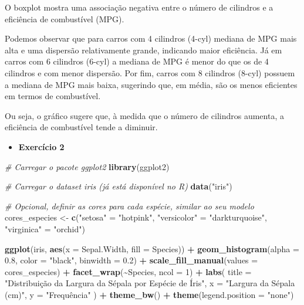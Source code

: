 \documentclass[
]{book}
\newenvironment{Shaded}{\begin{snugshade}}{\end{snugshade}}
\newcommand{\AttributeTok}[1]{\textcolor[rgb]{0.13,0.29,0.53}{#1}}
\newcommand{\CommentTok}[1]{\textcolor[rgb]{0.56,0.35,0.01}{\textit{#1}}}
\newcommand{\DecValTok}[1]{\textcolor[rgb]{0.00,0.00,0.81}{#1}}
\newcommand{\FloatTok}[1]{\textcolor[rgb]{0.00,0.00,0.81}{#1}}
\newcommand{\FunctionTok}[1]{\textcolor[rgb]{0.13,0.29,0.53}{\textbf{#1}}}
\newcommand{\NormalTok}[1]{#1}
\newcommand{\OtherTok}[1]{\textcolor[rgb]{0.56,0.35,0.01}{#1}}
\newcommand{\SpecialCharTok}[1]{\textcolor[rgb]{0.81,0.36,0.00}{\textbf{#1}}}
\newcommand{\StringTok}[1]{\textcolor[rgb]{0.31,0.60,0.02}{#1}}
\providecommand{\tightlist}{%
  \setlength{\itemsep}{0pt}\setlength{\parskip}{0pt}}
\begin{document}
O boxplot mostra uma associação negativa entre o número de cilindros e a eficiência de combustível (MPG).

Podemos observar que para carros com 4 cilindros (4-cyl) mediana de MPG mais alta e uma dispersão relativamente grande, indicando maior eficiência. Já em carros com 6 cilindros (6-cyl) a mediana de MPG é menor do que os de 4 cilindros e com menor dispersão. Por fim, carros com 8 cilindros (8-cyl) possuem a mediana de MPG mais baixa, sugerindo que, em média, são os menos eficientes em termos de combustível.

Ou seja, o gráfico sugere que, à medida que o número de cilindros aumenta, a eficiência de combustível tende a diminuir.

\begin{itemize}
\tightlist
\item
  \textbf{Exercício 2}
\end{itemize}

\begin{Shaded}
\begin{Highlighting}[]
\CommentTok{\# Carregar o pacote ggplot2}
\FunctionTok{library}\NormalTok{(ggplot2)}

\CommentTok{\# Carregar o dataset iris (já está disponível no R)}
\FunctionTok{data}\NormalTok{(}\StringTok{"iris"}\NormalTok{)}

\CommentTok{\# Opcional, definir as cores para cada espécie, similar ao seu modelo}
\NormalTok{cores\_especies }\OtherTok{\textless{}{-}} \FunctionTok{c}\NormalTok{(}\StringTok{"setosa"} \OtherTok{=} \StringTok{"hotpink"}\NormalTok{,}
                    \StringTok{"versicolor"} \OtherTok{=} \StringTok{"darkturquoise"}\NormalTok{,  }
                    \StringTok{"virginica"} \OtherTok{=} \StringTok{"orchid"}\NormalTok{) }


\FunctionTok{ggplot}\NormalTok{(iris, }\FunctionTok{aes}\NormalTok{(}\AttributeTok{x =}\NormalTok{ Sepal.Width, }\AttributeTok{fill =}\NormalTok{ Species)) }\SpecialCharTok{+}
  \FunctionTok{geom\_histogram}\NormalTok{(}\AttributeTok{alpha =} \FloatTok{0.8}\NormalTok{, }\AttributeTok{color =} \StringTok{"black"}\NormalTok{, }\AttributeTok{binwidth =} \FloatTok{0.2}\NormalTok{) }\SpecialCharTok{+} 
  \FunctionTok{scale\_fill\_manual}\NormalTok{(}\AttributeTok{values =}\NormalTok{ cores\_especies) }\SpecialCharTok{+}
  \FunctionTok{facet\_wrap}\NormalTok{(}\SpecialCharTok{\textasciitilde{}}\NormalTok{Species, }\AttributeTok{ncol =} \DecValTok{1}\NormalTok{) }\SpecialCharTok{+} 
  \FunctionTok{labs}\NormalTok{(}
    \AttributeTok{title =} \StringTok{"Distribuição da Largura da Sépala por Espécie de Íris"}\NormalTok{,}
    \AttributeTok{x =} \StringTok{"Largura da Sépala (cm)"}\NormalTok{,}
    \AttributeTok{y =} \StringTok{"Frequência"}
\NormalTok{  ) }\SpecialCharTok{+}
  \FunctionTok{theme\_bw}\NormalTok{() }\SpecialCharTok{+} 
  \FunctionTok{theme}\NormalTok{(}\AttributeTok{legend.position =} \StringTok{"none"}\NormalTok{) }
\end{Highlighting}
\end{Shaded}
\end{document}
